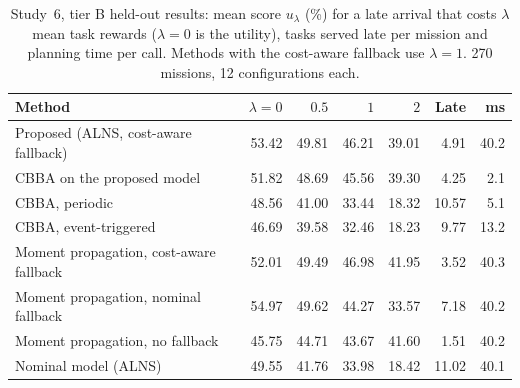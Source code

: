 \begin{table}[t]
\caption{Study~6, tier B held-out results: mean score $u_\lambda$ (\%) for a late arrival that costs $\lambda$ mean task rewards ($\lambda=0$ is the utility), tasks served late per mission and planning time per call. Methods with the cost-aware fallback use $\lambda=1$. 270 missions, 12 configurations each.}\label{tab:s6}
\centering\small
\begin{tabular}{lrrrrrr}
\toprule
Method & $\lambda=0$ & $0.5$ & $1$ & $2$ & Late & ms \\
\midrule
Proposed (ALNS, cost-aware fallback) & 53.42 & 49.81 & 46.21 & 39.01 & 4.91 & 40.2 \\
CBBA on the proposed model & 51.82 & 48.69 & 45.56 & 39.30 & 4.25 & 2.1 \\
CBBA, periodic & 48.56 & 41.00 & 33.44 & 18.32 & 10.57 & 5.1 \\
CBBA, event-triggered & 46.69 & 39.58 & 32.46 & 18.23 & 9.77 & 13.2 \\
Moment propagation, cost-aware fallback & 52.01 & 49.49 & 46.98 & 41.95 & 3.52 & 40.3 \\
Moment propagation, nominal fallback & 54.97 & 49.62 & 44.27 & 33.57 & 7.18 & 40.2 \\
Moment propagation, no fallback & 45.75 & 44.71 & 43.67 & 41.60 & 1.51 & 40.2 \\
Nominal model (ALNS) & 49.55 & 41.76 & 33.98 & 18.42 & 11.02 & 40.1 \\
\bottomrule
\end{tabular}
\end{table}
